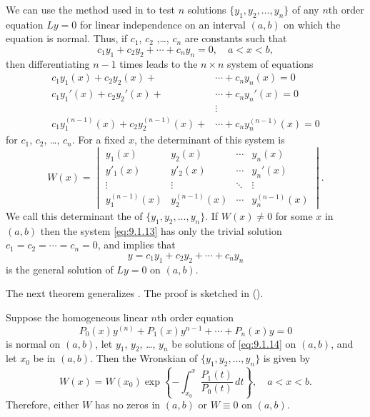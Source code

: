 
We can use the method used in  to test $n$ solutions $\{y_1,y_2,\dots,y_n\}$ of any
$n$th order equation $Ly=0$ for linear independence on an interval
$(a,b)$ on which the equation is normal. Thus, if $c_1$, $c_2$ ,\dots,
$c_n$ are constants such that
\[
c_1y_1+c_2y_2+\cdots+c_ny_n=0,\quad a<x<b,
\]
then differentiating $n-1$ times leads to the $n\times n$
system of equations
\begin{equation} \label{eq:9.1.13}
\begin{aligned}
c_1y_1(x)+c_2y_2(x)+&\cdots+c_ny_n(x)=0\\
c_1y_1'(x)+c_2y_2'(x)+&\cdots+c_ny_n'(x)=0\\
&\vdots\\
c_1y_1^{(n-1)}(x)+c_2y_2^{(n-1)}(x)+&\cdots+c_ny_n^{(n-1)}(x)=0
\end{aligned}
\end{equation}
for $c_1$, $c_2$, \dots, $c_n$. For a fixed $x$,  the determinant of this
system is
\[
W(x)=\begin{vmatrix}
y_1(x)&y_2(x)&\cdots&y_n(x)\\
y'_1(x)&y'_2(x)&\cdots&y_n'(x)\\
\vdots&\vdots&\ddots&\vdots\\
y_1^{(n-1)}(x)&y_2^{(n-1)}(x)&\cdots&y_n^{(n-1)}(x)
\end{vmatrix}.
\]
We call this determinant the
 of
$\{y_1,y_2,\dots,y_n\}$. If $W(x)\ne0$ for some $x$ in $(a,b)$ then
 the system \eqref{eq:9.1.13} has only the trivial solution
$c_1=c_2=\cdots=c_n=0$, and  implies that
\[
y=c_1y_1+c_2y_2+\cdots+c_ny_n
\]
is the general solution of $Ly=0$ on $(a,b)$.


The next theorem generalizes .
The proof is sketched in ().

\begin{theorem}\label{thmtype:9.1.3}
 Suppose the   homogeneous linear $n$th order equation
\begin{equation}\label{eq:9.1.14}
P_0(x)y^{(n)}+P_1(x)y^{n-1}+\cdots+P_n(x)y=0
\end{equation}
is normal on $(a,b)$, let $y_1$, $y_2$, \dots, $y_n$ be solutions of
\eqref{eq:9.1.14} on $(a,b)$, and let $x_0$ be in $(a,b)$. Then the
Wronskian of $\{y_1,y_2,\dots,y_n\}$ is given by
\begin{equation}  \label{eq:9.1.15}
W(x)=W(x_0)\exp\left\{-\int^x_{x_0}\frac{P_1(t)}{P_0(t)}\,
dt\right\},\quad a<x<b.
\end{equation}
Therefore,  either $W$ has no zeros in  $(a,b)$ or $W\equiv0$
on  $(a,b)$.
\end{theorem}



